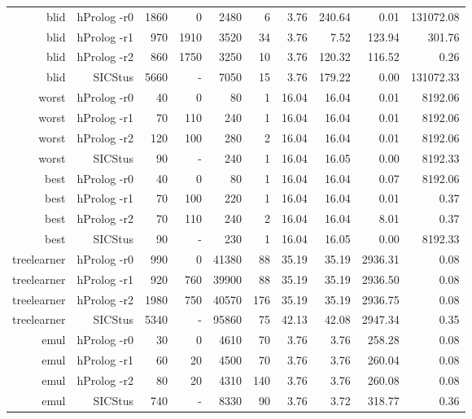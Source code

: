 \documentclass{tlp}
\begin{document}
\begin{table}[!]
\begin{center}
\begin{tabular}{|r|r||r|r|r||r|r|r|r|r|}
blid & hProlog -r0 & 1860 & 0 & 2480 & 6 & 3.76 & 240.64 & 0.01 & 131072.08 \\ 
blid & hProlog -r1 & 970 & 1910 & 3520 & 34 & 3.76 & 7.52 & 123.94 & 301.76 \\ 
blid & hProlog -r2 & 860 & 1750 & 3250 & 10 & 3.76 & 120.32 & 116.52 & 0.26 \\ 
blid & SICStus  & 5660 & - & 7050 & 15 & 3.76 & 179.22 & 0.00 & 131072.33 \\ 
\hline 

worst & hProlog -r0 & 40 & 0 & 80 & 1 & 16.04 & 16.04 & 0.01 & 8192.06 \\ 
worst & hProlog -r1 & 70 & 110 & 240 & 1 & 16.04 & 16.04 & 0.01 & 8192.06 \\ 
worst & hProlog -r2 & 120 & 100 & 280 & 2 & 16.04 & 16.04 & 0.01 & 8192.06 \\ 
worst & SICStus  & 90 & - & 240 & 1 & 16.04 & 16.05 & 0.00 & 8192.33 \\ 
\hline 

best & hProlog -r0 & 40 & 0 & 80 & 1 & 16.04 & 16.04 & 0.07 & 8192.06 \\ 
best & hProlog -r1 & 70 & 100 & 220 & 1 & 16.04 & 16.04 & 0.01 & 0.37 \\ 
best & hProlog -r2 & 70 & 110 & 240 & 2 & 16.04 & 16.04 & 8.01 & 0.37 \\ 
best & SICStus  & 90 & - & 230 & 1 & 16.04 & 16.05 & 0.00 & 8192.33 \\ 
\hline 
\hline 


treelearner & hProlog -r0 & 990 & 0 & 41380 & 88 & 35.19 & 35.19 & 2936.31 & 0.08 \\ 
treelearner & hProlog -r1 & 920 & 760 & 39900 & 88 & 35.19 & 35.19 & 2936.50 & 0.08 \\ 
treelearner & hProlog -r2 & 1980 & 750 & 40570 & 176 & 35.19 & 35.19 & 2936.75 & 0.08 \\ 
treelearner & SICStus  & 5340 & - & 95860 & 75 & 42.13 & 42.08 & 2947.34 & 0.35 \\ 
\hline 

emul & hProlog -r0 & 30 & 0 & 4610 & 70 & 3.76 & 3.76 & 258.28 & 0.08 \\ 
emul & hProlog -r1 & 60 & 20 & 4500 & 70 & 3.76 & 3.76 & 260.04 & 0.08 \\ 
emul & hProlog -r2 & 80 & 20 & 4310 & 140 & 3.76 & 3.76 & 260.08 & 0.08 \\ 
emul & SICStus  & 740 & - & 8330 & 90 & 3.76 & 3.72 & 318.77 & 0.36 \\ 
\hline 


\end{tabular}
\end{center}
\end{table}
\end{document}
